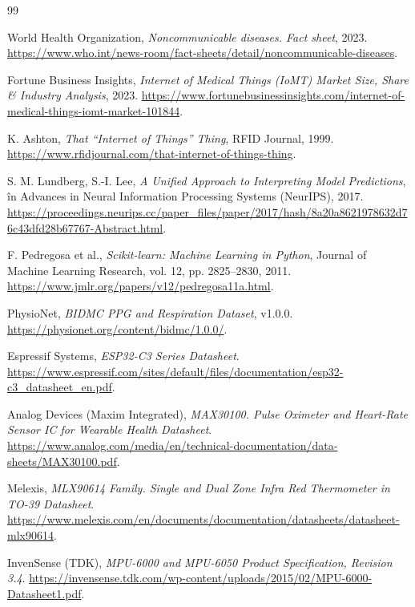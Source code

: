 \documentclass[12pt,a4paper,twoside]{article}
\begin{document}
\newpage
{}
\setcounter{section}{7}
\begin{thebibliography}{99}

 World Health Organization, \textit{Noncommunicable diseases. Fact sheet}, 2023. \url{https://www.who.int/news-room/fact-sheets/detail/noncommunicable-diseases}.

 Fortune Business Insights, \textit{Internet of Medical Things (IoMT) Market Size, Share \& Industry Analysis}, 2023. \url{https://www.fortunebusinessinsights.com/internet-of-medical-things-iomt-market-101844}.

 K. Ashton, \textit{That ``Internet of Things'' Thing}, RFID Journal, 1999. \url{https://www.rfidjournal.com/that-internet-of-things-thing}.

 S. M. Lundberg, S.-I. Lee, \textit{A Unified Approach to Interpreting Model Predictions}, în Advances in Neural Information Processing Systems (NeurIPS), 2017. \url{https://proceedings.neurips.cc/paper_files/paper/2017/hash/8a20a8621978632d76c43dfd28b67767-Abstract.html}.

 F. Pedregosa et al., \textit{Scikit-learn: Machine Learning in Python}, Journal of Machine Learning Research, vol. 12, pp. 2825--2830, 2011. \url{https://www.jmlr.org/papers/v12/pedregosa11a.html}.

 PhysioNet, \textit{BIDMC PPG and Respiration Dataset}, v1.0.0. \url{https://physionet.org/content/bidmc/1.0.0/}.

 Espressif Systems, \textit{ESP32-C3 Series Datasheet}. \url{https://www.espressif.com/sites/default/files/documentation/esp32-c3_datasheet_en.pdf}.

 Analog Devices (Maxim Integrated), \textit{MAX30100. Pulse Oximeter and Heart-Rate Sensor IC for Wearable Health Datasheet}. \url{https://www.analog.com/media/en/technical-documentation/data-sheets/MAX30100.pdf}.

 Melexis, \textit{MLX90614 Family. Single and Dual Zone Infra Red Thermometer in TO-39 Datasheet}. \url{https://www.melexis.com/en/documents/documentation/datasheets/datasheet-mlx90614}.

 InvenSense (TDK), \textit{MPU-6000 and MPU-6050 Product Specification, Revision 3.4}. \url{https://invensense.tdk.com/wp-content/uploads/2015/02/MPU-6000-Datasheet1.pdf}.


\end{thebibliography}
\end{document}
